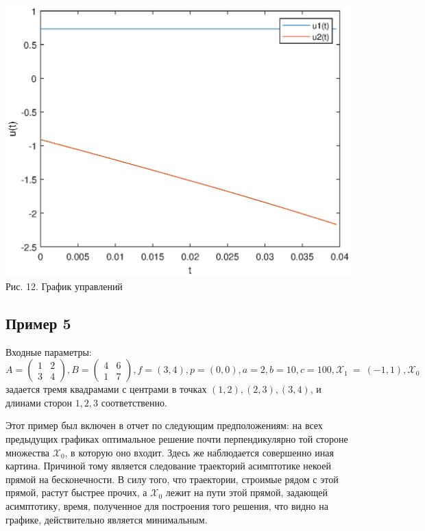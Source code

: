 \documentclass{article}
\theoremstyle{definition}
\begin{document}
\begin{center}
{\includegraphics[width=15cm]{uexample4.eps}}
{Рис. 12. График управлений}
\end{center}

\newpage

\subsection{Пример 5}

Входные параметры: $A = \begin{pmatrix} 1 & 2 \\ 3 & 4\end{pmatrix}, B = \begin{pmatrix} 4 & 6 \\ 1 & 7\end{pmatrix}, 
f = (3, 4), p = (0,0), a = 2, b = 10, c = 100, \mathcal{X}_1~=~(-1,1), \mathcal{X}_0$
 задается тремя квадрамами с центрами в точках $(1, 2), (2,3), (3,4)$,
и длинами сторон $1, 2, 3$ соответственно.

Этот пример был включен в отчет по следующим предположениям: на всех предыдущих графиках оптимальное решение почти перпендикулярно
той стороне множества $\mathcal{X}_0$, в которую оно входит. Здесь же наблюдается совершенно иная картина. Причиной тому является
следование траекторий асимптотике некоей прямой на бесконечности. В силу того, что траектории, строимые рядом с этой прямой,
растут быстрее прочих, а $\mathcal{X}_0$ лежит на пути этой прямой, задающей асимптотику, время, полученное для построения
того решения, что видно на графике, действительно является минимальным.
\end{document}
